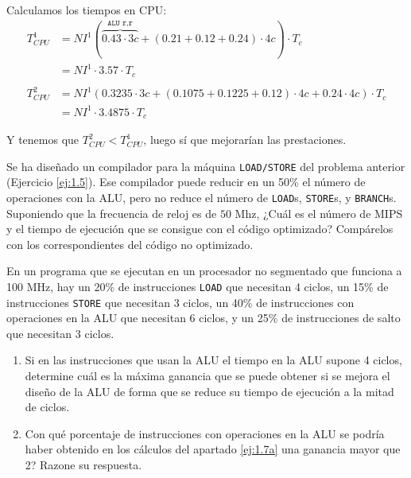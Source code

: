 \begin{ejercicio}
    Calculamos los tiempos en CPU:
    \begin{align*}
        T_{CPU}^1 &= NI^1 (\overbrace{0.43\cdot 3c}^{\texttt{ALU r,r}}+(0.21+0.12+0.24)\cdot 4c) \cdot T_c\\
                  &= NI^1 \cdot 3.57 \cdot T_c\\
                  & \\
        T_{CPU}^2 &= NI^1 (0.3235\cdot 3c + (0.1075+0.1225+0.12)\cdot 4c + 0.24 \cdot 4c) \cdot T_c\\
        &= NI^1 \cdot 3.4875 \cdot T_c
    \end{align*}

    Y tenemos que $T_{CPU}^2 < T_{CPU}^1$, luego sí que mejorarían las prestaciones.

\end{ejercicio}

\begin{ejercicio}
    Se ha diseñado un compilador para la máquina \verb|LOAD/STORE| del problema anterior (Ejercicio \ref{ej:1.5}). Ese
    compilador puede reducir en un 50\% el número de operaciones con la ALU, pero no reduce el número de
    \verb|LOAD|s, \verb|STORE|s, y \verb|BRANCH|s. Suponiendo que la frecuencia de reloj es de $50$ Mhz,
    ¿Cuál es el número de
    MIPS y el tiempo de ejecución que se consigue con el código optimizado? Compárelos con los
    correspondientes del código no optimizado.
\end{ejercicio}

\begin{ejercicio}
    En un programa que se ejecutan en un procesador no segmentado que funciona a 100 MHz, hay
    un 20\% de instrucciones \verb|LOAD| que necesitan 4 ciclos, un 15\% de instrucciones \verb|STORE| que necesitan 3 ciclos,
    un 40\% de instrucciones con operaciones en la ALU que necesitan 6 ciclos, y un 25\% de instrucciones de
    salto que necesitan 3 ciclos.
    \begin{enumerate}
        \item\label{ej:1.7a}
        Si en las instrucciones que usan la ALU el tiempo en la ALU supone 4 ciclos, determine cuál es la máxima ganancia que se puede obtener si se mejora el diseño de la ALU de forma que
        se reduce su tiempo de ejecución a la mitad de ciclos.
        \item Con qué porcentaje de instrucciones con operaciones en la ALU se podría haber obtenido en los cálculos del apartado \ref{ej:1.7a} una ganancia mayor que 2?
        Razone su respuesta.
    \end{enumerate}
\end{ejercicio}


